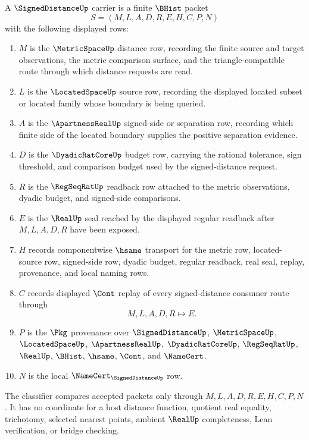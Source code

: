 \begin{definition}
\label{def:signed-distance-carrier}
A $\SignedDistanceUp$ carrier is a finite $\BHist$ packet
$$
S=(M,L,A,D,R,E,H,C,P,N)
$$
with the following displayed rows:
\begin{enumerate}
\item $M$ is the $\MetricSpaceUp$ distance row, recording the finite source and target observations, the metric comparison surface, and the triangle-compatible route through which distance requests are read.
\item $L$ is the $\LocatedSpaceUp$ source row, recording the displayed located subset or located family whose boundary is being queried.
\item $A$ is the $\ApartnessRealUp$ signed-side or separation row, recording which finite side of the located boundary supplies the positive separation evidence.
\item $D$ is the $\DyadicRatCoreUp$ budget row, carrying the rational tolerance, sign threshold, and comparison budget used by the signed-distance request.
\item $R$ is the $\RegSeqRatUp$ readback row attached to the metric observations, dyadic budget, and signed-side comparisons.
\item $E$ is the $\RealUp$ seal reached by the displayed regular readback after $M,L,A,D,R$ have been exposed.
\item $H$ records componentwise $\hsame$ transport for the metric row, located-source row, signed-side row, dyadic budget, regular readback, real seal, replay, provenance, and local naming rows.
\item $C$ records displayed $\Cont$ replay of every signed-distance consumer route through
$$
M,L,A,D,R \longmapsto E .
$$
\item $P$ is the $\Pkg$ provenance over $\SignedDistanceUp$, $\MetricSpaceUp$, $\LocatedSpaceUp$, $\ApartnessRealUp$, $\DyadicRatCoreUp$, $\RegSeqRatUp$, $\RealUp$, $\BHist$, $\hsame$, $\Cont$, and $\NameCert$.
\item $N$ is the local $\NameCert_{\SignedDistanceUp}$ row.
\end{enumerate}
The classifier compares accepted packets only through $M,L,A,D,R,E,H,C,P,N$. It has no coordinate for a host distance function, quotient real equality, trichotomy, selected nearest points, ambient $\RealUp$ completeness, Lean verification, or bridge checking.
\end{definition}

